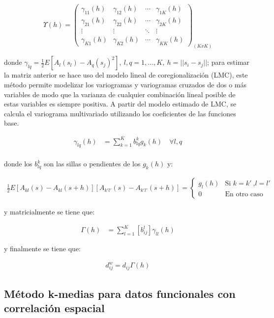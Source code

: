 \documentclass[
]{book}
\begin{document}
\begin{equation*}
\Upsilon(h)=
\begin{pmatrix}
\gamma_{11}(h) & \gamma_{12}(h) & \cdots & \gamma_{1K}(h)\\
\gamma_{21}(h) & \gamma_{22}(h) & \cdots & \gamma_{2K}(h)\\
\vdots & \vdots & \ddots & \vdots\\
\gamma_{K1}(h) & \gamma_{K2}(h) & \cdots & \gamma_{KK}(h)
\end{pmatrix}_{(KxK)}
\end{equation*}

donde \(\gamma_{lq}=\frac{1}{2}E[A_l(s_l)-A_q(s_j)^2],\ l,q=1,...,K,\ h=||s_i-s_j||\); para estimar la matriz anterior se hace uso del modelo lineal de coregionalización (LMC), este método permite modelizar los variogramas y variogramas cruzados de dos o más variables de modo que la varianza de cualquier combinación lineal posible de estas variables es siempre positiva. A partir del modelo estimado de LMC, se calcula el variograma multivariado utilizando los coeficientes de las funciones base.

\begin{align*}
    \gamma_{lq}(h)&=\sum_{k=1}^K b_{lq}^kg_k(h)\quad \forall l,q\\
\end{align*}

donde los \(b_{lq}^k\) son las sillas o pendientes de los \(g_k(h)\) y:

\begin{align*}
    \frac{1}{2}E\left[A_{kl}(s)-A_{kl}(s+h) \right]\left[A_{k'l'}(s)-A_{k'l'}(s+h) \right]=\left \{ \begin{matrix} g_l(h) & \mbox{Si } k=k'\ \mbox{,}l=l'\\
    0 & \mbox{En otro caso }\end{matrix}\right.  
\end{align*}

y matricialmente se tiene que:

\begin{align*}
    \Gamma(h)&=\sum_{l=1}^K[b_{ij}^l]\gamma_{ll}(h)
\end{align*}

y finalmente se tiene que:

\begin{align*}
    d_{ij}^w=d_{ij}\Gamma(h)
\end{align*}

\hypertarget{muxe9todo-k-medias-para-datos-funcionales-con-correlaciuxf3n-espacial}{%
\subsection{Método k-medias para datos funcionales con correlación espacial}\label{muxe9todo-k-medias-para-datos-funcionales-con-correlaciuxf3n-espacial}}
\end{document}
